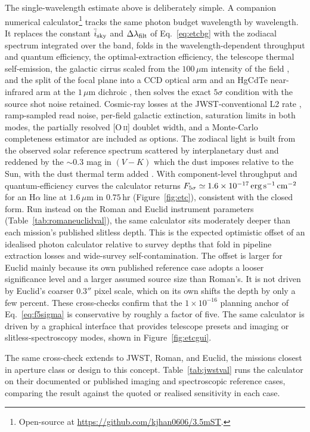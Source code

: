 \documentclass[10pt,onecolumn]{article}
\begin{document}
The single-wavelength estimate above is deliberately simple. A companion numerical calculator\footnote{Open-source at \url{https://github.com/kjhan0606/3.5mST}.} tracks the same photon budget wavelength by wavelength. It replaces the constant $\bar i_{\rm sky}$ and $\Delta\lambda_{\rm filt}$ of Eq.~\eqref{eq:etcbg} with the zodiacal spectrum integrated over the band, folds in the wavelength-dependent throughput and quantum efficiency, the optimal-extraction efficiency, the telescope thermal self-emission, the galactic cirrus scaled from the $100\,\mu$m intensity of the field \cite{ienaka2013}, and the split of the focal plane into a CCD optical arm and an HgCdTe near-infrared arm at the $1\,\mu$m dichroic \cite{cropper2016}, then solves the exact $5\sigma$ condition with the source shot noise retained. Cosmic-ray losses at the JWST-conventional L2 rate \cite{jwstdocs}, ramp-sampled read noise, per-field galactic extinction, saturation limits in both modes, the partially resolved [O\,\textsc{ii}] doublet width, and a Monte-Carlo completeness estimator are included as options. The zodiacal light is built from the observed solar reference spectrum scattered by interplanetary dust and reddened by the $\sim0.3$ mag in $(V-K)$ which the dust imposes relative to the Sun, with the dust thermal term added \cite{leinert1998}. With component-level throughput and quantum-efficiency curves the calculator returns $F_{5\sigma}\simeq1.6\times10^{-17}\,{\rm erg\,s^{-1}\,cm^{-2}}$ for an H$\alpha$ line at $1.6\,\mu$m in $0.75$\,hr (Figure~\ref{fig:etc}), consistent with the closed form. Run instead on the Roman and Euclid instrument parameters (Table~\ref{tab:romaneuclidval}), the same calculator sits moderately deeper than each mission's published slitless depth. This is the expected optimistic offset of an idealised photon calculator relative to survey depths that fold in pipeline extraction losses and wide-survey self-contamination. The offset is larger for Euclid mainly because its own published reference case adopts a looser significance level and a larger assumed source size than Roman's. It is not driven by Euclid's coarser $0.3''$ pixel scale, which on its own shifts the depth by only a few percent. These cross-checks confirm that the $1\times10^{-16}$ planning anchor of Eq.~\eqref{eq:f5sigma} is conservative by roughly a factor of five. The same calculator is driven by a graphical interface that provides telescope presets and imaging or slitless-spectroscopy modes, shown in Figure~\ref{fig:etcgui}.

The same cross-check extends to JWST, Roman, and Euclid, the missions closest in aperture class or design to this concept. Table~\ref{tab:jwstval} runs the calculator on their documented or published imaging and spectroscopic reference cases, comparing the result against the quoted or realised sensitivity in each case.
\end{document}

